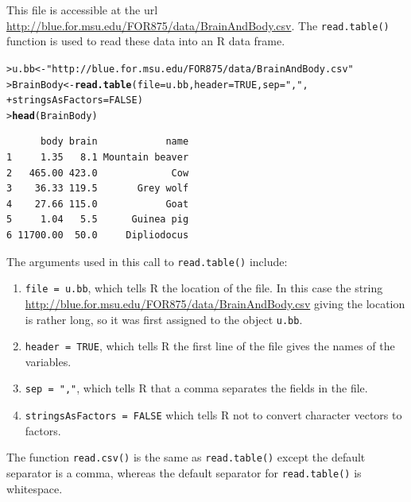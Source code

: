 \documentclass[12pt,oneside]{book}\usepackage[]{graphicx}\usepackage[]{color}
\makeatletter
\newcommand{\hlnum}[1]{\textcolor[rgb]{0.686,0.059,0.569}{#1}}%
\newcommand{\hlstr}[1]{\textcolor[rgb]{0.192,0.494,0.8}{#1}}%
\newcommand{\hlstd}[1]{\textcolor[rgb]{0.345,0.345,0.345}{#1}}%
\newcommand{\hlkwb}[1]{\textcolor[rgb]{0.69,0.353,0.396}{#1}}%
\newcommand{\hlkwc}[1]{\textcolor[rgb]{0.333,0.667,0.333}{#1}}%
\newcommand{\hlkwd}[1]{\textcolor[rgb]{0.737,0.353,0.396}{\textbf{#1}}}%
\newenvironment{kframe}{%
 \def\at@end@of@kframe{}%
 \ifinner\ifhmode%
  \def\at@end@of@kframe{\end{minipage}}%
  \begin{minipage}{\columnwidth}%
 \fi\fi%
 \def\FrameCommand##1{\hskip\@totalleftmargin \hskip-\fboxsep
 \colorbox{shadecolor}{##1}\hskip-\fboxsep
     \hskip-\linewidth \hskip-\@totalleftmargin \hskip\columnwidth}%
 \MakeFramed {\advance\hsize-\width
   \@totalleftmargin\z@ \linewidth\hsize
   \@setminipage}}%
 {\par\unskip\endMakeFramed%
 \at@end@of@kframe}
\newenvironment{knitrout}{}{} %
\makeatother
\begin{document}
This file is accessible at the url \url{http://blue.for.msu.edu/FOR875/data/BrainAndBody.csv}. The \verb+read.table()+ function is used to read these data into an R data frame.
\begin{knitrout}
\color{fgcolor}\begin{kframe}
\begin{alltt}
\hlstd{> }\hlstd{u.bb} \hlkwb{<-} \hlstr{"http://blue.for.msu.edu/FOR875/data/BrainAndBody.csv"}
\hlstd{> }\hlstd{BrainBody} \hlkwb{<-} \hlkwd{read.table}\hlstd{(}\hlkwc{file} \hlstd{= u.bb,} \hlkwc{header} \hlstd{=} \hlnum{TRUE}\hlstd{,} \hlkwc{sep} \hlstd{=} \hlstr{","}\hlstd{,}
\hlstd{+ }                        \hlkwc{stringsAsFactors} \hlstd{=} \hlnum{FALSE}\hlstd{)}
\hlstd{> }\hlkwd{head}\hlstd{(BrainBody)}
\end{alltt}
\begin{verbatim}
      body brain            name
1     1.35   8.1 Mountain beaver
2   465.00 423.0             Cow
3    36.33 119.5       Grey wolf
4    27.66 115.0            Goat
5     1.04   5.5      Guinea pig
6 11700.00  50.0     Dipliodocus
\end{verbatim}
\end{kframe}
\end{knitrout}
The arguments used in this call to \verb+read.table()+ include:
\begin{enumerate}
\item \verb+file = u.bb+, which tells R the location of the file. In this case the string \url{http://blue.for.msu.edu/FOR875/data/BrainAndBody.csv} giving the location is rather long, so it was first assigned to the object \verb+u.bb+.
\item \verb+header = TRUE+, which tells R the first line of the file gives the names of the variables.
\item \verb+sep = ","+, which tells R that a comma separates the fields in the file.
\item \verb+stringsAsFactors = FALSE+ which tells R not to convert character vectors to factors.
\end{enumerate}
The function \verb+read.csv()+ is the same as \verb+read.table()+ except the default separator is a comma, whereas the default separator for \verb+read.table()+ is whitespace. 
\end{document}
